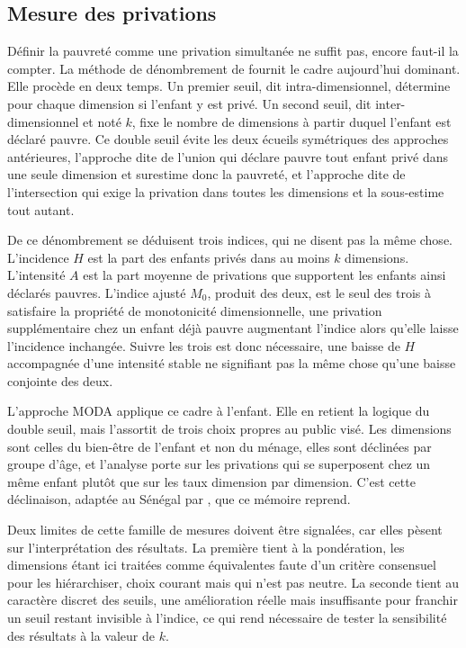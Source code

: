 \subsection{Mesure des privations}

Définir la pauvreté comme une privation simultanée ne suffit pas, encore
faut-il la compter. La méthode de dénombrement de \textcite{alkire2011} fournit
le cadre aujourd'hui dominant. Elle procède en deux temps. Un premier seuil,
dit intra-dimensionnel, détermine pour chaque dimension si l'enfant y est privé.
Un second seuil, dit inter-dimensionnel et noté $k$, fixe le nombre de
dimensions à partir duquel l'enfant est déclaré pauvre. Ce double seuil évite
les deux écueils symétriques des approches antérieures, l'approche dite de
l'union qui déclare pauvre tout enfant privé dans une seule dimension et
surestime donc la pauvreté, et l'approche dite de l'intersection qui exige la
privation dans toutes les dimensions et la sous-estime tout autant.

De ce dénombrement se déduisent trois indices, qui ne disent pas la même chose.
L'incidence $H$ est la part des enfants privés dans au moins $k$ dimensions.
L'intensité $A$ est la part moyenne de privations que supportent les enfants
ainsi déclarés pauvres. L'indice ajusté $M_0$, produit des deux, est le seul
des trois à satisfaire la propriété de monotonicité dimensionnelle, une
privation supplémentaire chez un enfant déjà pauvre augmentant l'indice alors
qu'elle laisse l'incidence inchangée. Suivre les trois est donc nécessaire, une
baisse de $H$ accompagnée d'une intensité stable ne signifiant pas la même
chose qu'une baisse conjointe des deux.

L'approche MODA \parencite{deneubourg2012} applique ce cadre à l'enfant. Elle
en retient la logique du double seuil, mais l'assortit de trois choix propres
au public visé. Les dimensions sont celles du bien-être de l'enfant et non du
ménage, elles sont déclinées par groupe d'âge, et l'analyse porte sur les
privations qui se superposent chez un même enfant plutôt que sur les taux
dimension par dimension. C'est cette déclinaison, adaptée au Sénégal par
\textcite{ansd2024}, que ce mémoire reprend.

Deux limites de cette famille de mesures doivent être signalées, car elles
pèsent sur l'interprétation des résultats. La première tient à la pondération,
les dimensions étant ici traitées comme équivalentes faute d'un critère
consensuel pour les hiérarchiser, choix courant mais qui n'est pas neutre. La
seconde tient au caractère discret des seuils, une amélioration réelle mais
insuffisante pour franchir un seuil restant invisible à l'indice, ce qui rend
nécessaire de tester la sensibilité des résultats à la valeur de $k$.
